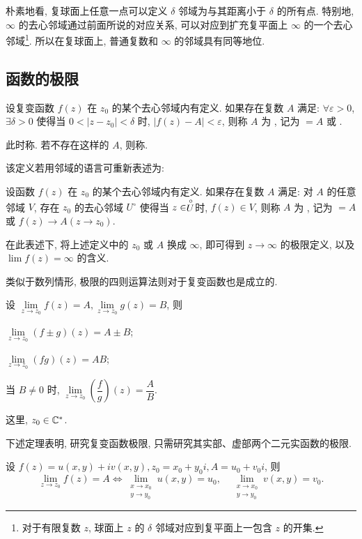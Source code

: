 朴素地看, 复球面上任意一点可以定义 $\delta$ 邻域为与其距离小于 $\delta$ 的所有点.
特别地, $\infty$ 的去心邻域通过前面所说的对应关系, 可以对应到扩充复平面上 $\infty$ 的一个去心邻域\footnote{
  对于有限复数 $z$, 球面上 $z$ 的 $\delta$ 邻域对应到复平面上一包含 $z$ 的开集.
}.
所以在复球面上, 普通复数和 $\infty$ 的邻域具有同等地位.


\subsection{函数的极限}

\begin{definition}
  设复变函数 $f(z)$ 在 $z_0$ 的某个去心邻域内有定义.
  如果存在复数 $A$ 满足: $\forall\varepsilon>0$, $\exists \delta>0$ 使得当 $0<|z-z_0|<\delta$ 时, $|f(z)-A|<\varepsilon$, 则称 $A$ 为 , 记为 $=A$ 或 .
\end{definition}
此时称.
若不存在这样的 $A$, 则称.

该定义若用邻域的语言可重新表述为:
\begin{definition}
  设函数 $f(z)$ 在 $z_0$ 的某个去心邻域内有定义.
  如果存在复数 $A$ 满足: 对 $A$ 的任意邻域 $V$, 存在 $z_0$ 的去心邻域 $U^\circ$ 使得当 $z\in\stackrel{\circ}{U}\!\!$ 时, $f(z)\in V$, 则称 $A$ 为 , 记为 $=A$ 或 \emph{$f(z)\to A (z\to z_0)$}.
\end{definition}
在此表述下, 将上述定义中的 $z_0$ 或 $A$ 换成 $\infty$, 即可得到 $z\to\infty$ 的极限定义, 以及 $\lim f(z)=\infty$ 的含义.

类似于数列情形, 极限的四则运算法则对于复变函数也是成立的.
\begin{theorem}\label{thm:limfunctionfour}
  设 $\lim\limits_{z\to z_0}f(z)=A,\lim\limits_{z\to z_0}g(z)=B$, 则
  \begin{enumpar}
    \item $\lim\limits_{z\to z_0}(f\pm g)(z)=A\pm B$;
    \item $\lim\limits_{z\to z_0}(fg)(z)=AB$;
    \item 当 $B\neq 0$ 时, $\lim\limits_{z\to z_0}\left(\dfrac fg\right)(z)=\dfrac AB$.
  \end{enumpar}
  这里, $z_0\in{\mathbb{C}}^*$.
\end{theorem}

下述定理表明, 研究复变函数极限, 只需研究其实部、虚部两个二元实函数的极限.
\begin{theorem}\label{thm:limfunction}
  设 $f(z)=u(x,y)+iv(x,y),z_0=x_0+y_0i,A=u_0+v_0i$, 则
  \[\lim_{z\to z_0}f(z)=A\iff
  \lim_{\substack{x\to x_0\\y\to y_0}}u(x,y)=u_0,\quad
  \lim_{\substack{x\to x_0\\y\to y_0}}v(x,y)=v_0.\]
\end{theorem}

